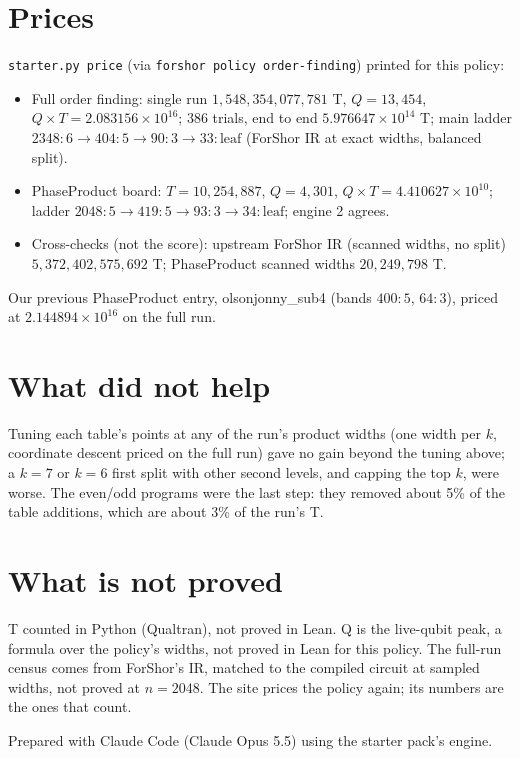 \documentclass[11pt]{article}
\begin{document}
\section*{Prices}
\texttt{starter.py price} (via \texttt{forshor policy order-finding}) printed for this policy:
\begin{itemize}
  \item Full order finding: single run $1{,}548{,}354{,}077{,}781$ T, $Q = 13{,}454$, $Q \times T = 2.083156 \times 10^{16}$; 386 trials, end to end $5.976647 \times 10^{14}$ T; main ladder $2348{:}6 \to 404{:}5 \to 90{:}3 \to 33{:}\mathrm{leaf}$ (ForShor IR at exact widths, balanced split).
  \item PhaseProduct board: $T = 10{,}254{,}887$, $Q = 4{,}301$, $Q \times T = 4.410627 \times 10^{10}$; ladder $2048{:}5 \to 419{:}5 \to 93{:}3 \to 34{:}\mathrm{leaf}$; engine 2 agrees.
  \item Cross-checks (not the score): upstream ForShor IR (scanned widths, no split) $5{,}372{,}402{,}575{,}692$ T; PhaseProduct scanned widths $20{,}249{,}798$ T.
\end{itemize}
Our previous PhaseProduct entry, olsonjonny\_sub4 (bands $400{:}5$, $64{:}3$), priced at $2.144894 \times 10^{16}$ on the full run.

\section*{What did not help}
Tuning each table's points at any of the run's product widths (one width per $k$, coordinate descent priced on the full run) gave no gain beyond the tuning above; a $k = 7$ or $k = 6$ first split with other second levels, and capping the top $k$, were worse.
The even/odd programs were the last step: they removed about 5\% of the table additions, which are about 3\% of the run's T.

\section*{What is not proved}
T counted in Python (Qualtran), not proved in Lean.
Q is the live-qubit peak, a formula over the policy's widths, not proved in Lean for this policy.
The full-run census comes from ForShor's IR, matched to the compiled circuit at sampled widths, not proved at $n = 2048$.
The site prices the policy again; its numbers are the ones that count.

Prepared with Claude Code (Claude Opus 5.5) using the starter pack's engine.
\end{document}
